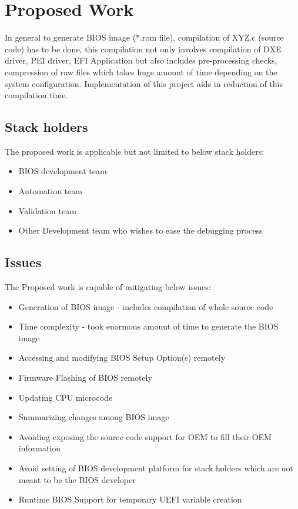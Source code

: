 \section{Proposed Work}\label{section-proposed-work}
In general to generate BIOS image (*.rom file), compilation of XYZ.c (source code) has to be done, this compilation not only
involves compilation of DXE driver, PEI driver, EFI Application but also includes pre-processing checks, compression of raw files which takes huge amount of time depending on the system configuration. Implementation of this project aids in reduction of this compilation time.

\subsection{Stack holders}\label{subsection-stack-holders}
The proposed work is applicable but not limited to below stack holders:
\begin{itemize}
	\item BIOS development team
	\item Automation team
	\item Validation team
	\item Other Development team who wishes to ease the debugging process
\end{itemize}

\subsection{Issues}\label{subsection-issues}
The Proposed work is capable of mitigating below issues:
\begin{itemize}
	\item Generation of BIOS image - includes compilation of whole source code
	\item Time complexity - took enormous amount of time to generate the BIOS image 
	\item Accessing and modifying BIOS Setup Option(s) remotely
	\item Firmware Flashing of BIOS remotely
	\item Updating CPU microcode
	\item Summarizing changes among BIOS image
	\item Avoiding exposing the source code support for OEM to fill their OEM information
	\item Avoid setting of BIOS development platform for stack holders which are not meant to be the BIOS developer
	\item Runtime BIOS Support for temporary UEFI variable creation
\end{itemize}


